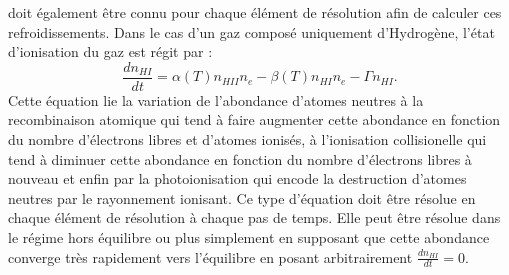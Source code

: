  doit également être connu pour chaque élément de résolution afin de calculer ces refroidissements. Dans le cas d'un gaz composé uniquement d'Hydrogène, l'état d'ionisation du gaz est régit par :
\begin{equation}
\frac{dn_{HI}}{dt}=\alpha(T) n_{HII} n_e-\beta(T) n_{HI}n_e-\Gamma n_{HI}.
\label{e:eint}
\end{equation}
Cette équation lie la variation de l'abondance d'atomes neutres à la recombinaison atomique  qui tend à faire augmenter cette abondance en fonction du nombre d'électrons libres et d'atomes ionisés, à l'ionisation collisionelle  qui tend à diminuer cette abondance en fonction du nombre d'électrons libres à nouveau et enfin par la photoionisation  qui encode la destruction d'atomes neutres par le rayonnement ionisant. Ce type d'équation doit être résolue en chaque élément de résolution à chaque pas de temps. Elle peut être résolue dans le régime hors équilibre ou plus simplement en supposant que cette abondance converge très rapidement vers l'équilibre en posant arbitrairement $\frac{dn_{HI}}{dt}=0$.

